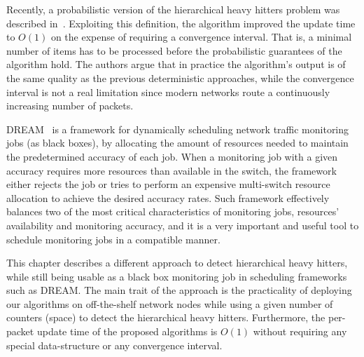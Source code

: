 Recently, a probabilistic version of the hierarchical heavy hitters problem was described in~\cite{ben2017constant}. Exploiting this definition, the algorithm improved the update time to $O(1)$ on the expense of requiring a convergence interval. That is, a minimal number of items has to be processed before the probabilistic guarantees of the algorithm hold. The authors argue that in practice the algorithm's output is of the same quality as the previous deterministic approaches, while the convergence interval is not a real limitation since modern networks route a continuously increasing number of packets.

DREAM~\cite{Moshref2014} is a framework for dynamically scheduling network traffic monitoring jobs (as black boxes), by allocating the amount of resources needed to maintain the predetermined accuracy of each job. When a monitoring job with a given accuracy requires more resources than  available in the switch, the framework either rejects the job or tries to perform an expensive multi-switch resource allocation to achieve the desired accuracy rates.
Such framework effectively balances two of the most critical characteristics of monitoring jobs, resources' availability and monitoring accuracy, and it is a very important and useful tool  to schedule monitoring jobs in a compatible manner.

This chapter describes a different approach to detect hierarchical heavy hitters,
while still being usable as a black box monitoring job in scheduling frameworks such as DREAM. The main trait of the approach is the practicality of deploying our algorithms on off-the-shelf network nodes while using a given number of counters (space) to detect the hierarchical heavy hitters. Furthermore, the per-packet update time of the proposed algorithms is $O(1)$ without requiring any special data-structure or any convergence interval.